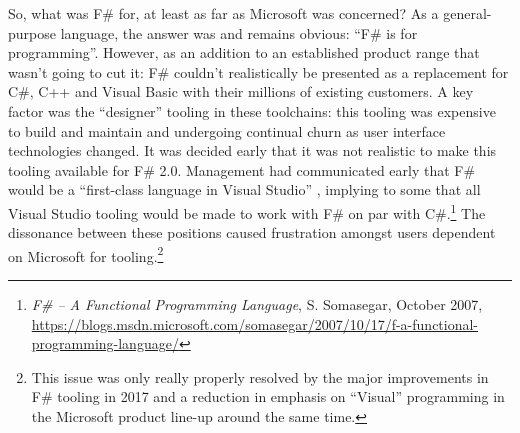 \documentclass[acmsmall]{acmart}\settopmatter{}
\begin{document}
So, what was F\# for, at least as far as Microsoft was concerned?  As a general-purpose language, the answer was and remains
obvious: “F\# is for programming”.  However, as an addition to an established product range that wasn’t going
to cut it: F\# couldn’t realistically be presented as a replacement for C\#, C++ and Visual Basic with their millions of existing customers.
A key factor was the “designer” tooling in these toolchains: this tooling was expensive to build and maintain and undergoing continual
churn as user interface technologies changed. It was decided early that it was not realistic to make this tooling available for F\# 2.0.
Management had communicated early that F\# would be a “first-class language in Visual Studio” , implying to some that all Visual Studio
tooling would be made to work with F\# on par with C\#.\footnote{\textit{F\# – A Functional Programming Language}, S. Somasegar, October 2007, \url{https://blogs.msdn.microsoft.com/somasegar/2007/10/17/f-a-functional-programming-language/}}
The dissonance between these positions caused frustration amongst users dependent on Microsoft for
tooling.\footnote{ This issue was only really properly resolved by the major improvements in F\# tooling in 2017 and a reduction in emphasis on “Visual” programming in the Microsoft product line-up around the same time.}
\end{document}
